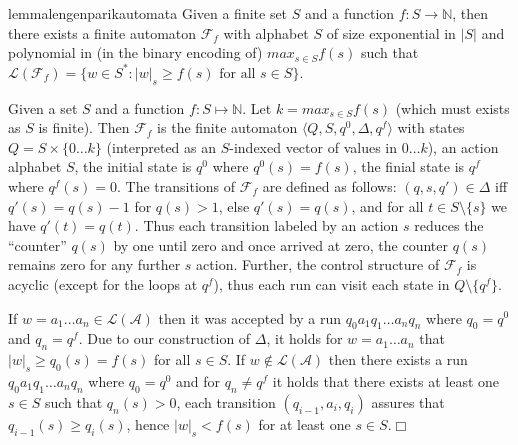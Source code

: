 \documentclass[runningheads,oribibl,]{article}
\newcommand{\tuple}[1]{\langle#1\rangle\xspace}
\newcommand{\Aa}{\ensuremath{\mathcal{A}}\xspace}
\newcommand{\Ff}{\ensuremath{\mathcal{F}}\xspace}
\newcommand{\Ll}{\ensuremath{\mathcal{L}}\xspace}
\newcommand{\NN}{\ensuremath{\mathbb{N}}\xspace}
\newenvironment{proof}{\noindent{\it Proof.\hspace*{.5cm}}}{}
\newcommand{\qed}{\hfill$\Box$}
\begin{document}
\begin{restatable}{lemma}{lengenparikautomata}\label{lem:genparikautomata}
  Given a finite set $S$ and a function $f:S\rightarrow \NN$,
  then there exists a finite automaton $\Ff_f$ with
  alphabet $S$ of size exponential in $\vert S\vert$ and polynomial in
  (in the binary encoding of)
   $max_{s\in S}f(s)$
  such that $\Ll(\Ff_f)=\{w \in S^* : |w|_s\geq f(s) \text{ for all } s\in
  S\}$.
\end{restatable}
\begin{proof}
  Given a set $S$ and a function $f:S\mapsto \NN$. Let $k=max_{s\in S}f(s)$
  (which must exists as $S$ is finite). Then  $\Ff_f$ is the finite
  automaton $\tuple{Q,S,q^0,\Delta,q^f}$ with
  states $Q=S\times\{0\dots k\}$ (interpreted as an $S$-indexed vector of values
  in $0\dots k$), an action alphabet $S$, the initial state is $q^0$ where
  $q^0(s)=f(s)$, the finial state is $q^f$ where $q^f(s)=0$.
  The transitions of $\Ff_f$ are defined as follows:
  $(q,s,q')\in\Delta$ iff $q'(s)=q(s)-1$ for $q(s)>1$, else $q'(s)=q(s)$,
  and for all $t\in S\setminus\{s\}$ we have $q'(t)=q(t)$. Thus
  each transition labeled by an action $s$ reduces the ``counter'' $q(s)$
  by one until zero and once arrived at zero, the counter $q(s)$
  remains zero for any further $s$ action. Further, the control structure
  of $\Ff_f$ is acyclic (except for the loops at $q^f$), thus
  each run can visit each state in $Q\setminus \{q^f\}$.

  If $w=a_1\dots a_n\in\Ll(\Aa)$ then it was accepted by a run $q_0a_1q_1\dots
  a_nq_n$ where $q_0=q^0$ and $q_n=q^f$. Due to our construction of $\Delta$, it
  holds for $w=a_1\dots a_n$ that $|w|_s\geq q_0(s)=f(s)$ for all $s\in S$.
    If $w\notin \Ll(\Aa)$ then there exists a run $q_0 a_1q_1\dots a_nq_n$
  where $q_0=q^0$ and for $q_n\neq q^f$ it holds that there exists at least one
  $s\in S$ such that $q_n(s)>0$, each transition $(q_{i-1},a_i,q_i)$ assures that
  $q_{i-1}(s)\geq q_i(s)$, hence $|w|_s<f(s)$ for at least one $s\in S$.\qed
\end{proof}
\end{document}
